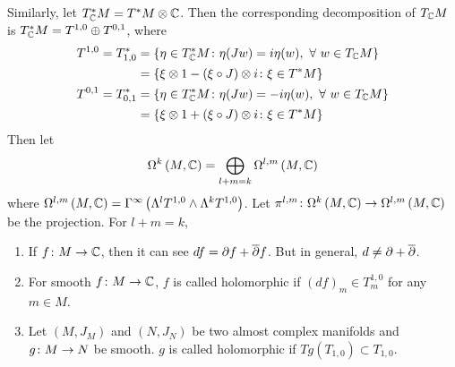 \documentclass[a4paper,12pt]{article}
\begin{document}
	Similarly, let $T^*_{\mathbb{C}}M = T^*M \otimes \mathbb{C}$. Then the corresponding decomposition of $T_{\mathbb{C}}M$ is $T^*_{\mathbb{C}}M = T^{1,0} \oplus T^{0,1}$, where
	\begin{equation*}
		\begin{split}
			T^{1,0} = T_{1,0}^* &= \left\{\eta \in T^*_{\mathbb{C}}M \colon \eta(Jw) = i\eta(w),~\forall~w \in T_{\mathbb{C}}M\right\} \\
			&= \left\{\xi \otimes 1 - (\xi \circ J) \otimes i \colon \xi \in T^*M\right\}\\
			T^{0,1} = T_{0,1}^* &= \left\{\eta \in T^*_{\mathbb{C}}M \colon \eta(Jw) = -i\eta(w),~\forall~w \in T_{\mathbb{C}}M\right\} \\
			&= \left\{\xi \otimes 1 + (\xi \circ J) \otimes i \colon \xi \in T^*M\right\}
		\end{split}
	\end{equation*}
	Then let
	\begin{equation*}
		\Omega^k\left(M,\mathbb{C}\right) = \bigoplus_{l+m = k} \Omega^{l,m}\left(M,\mathbb{C}\right)
	\end{equation*}
	where $\Omega^{l,m}\left(M,\mathbb{C}\right) = \Gamma^{\infty}\left(\Lambda^lT^{1,0} \wedge \Lambda^kT^{1,0}\right)$. Let $\pi^{l,m} \colon \Omega^k\left(M,\mathbb{C}\right) \rightarrow \Omega^{l,m}\left(M,\mathbb{C}\right)$ be the projection. For $l+m = k$,
	\begin{center}
	\end{center}
	\begin{rem}
		\begin{enumerate}
			\item If $f \colon M \rightarrow \mathbb{C}$, then it can see $df = \partial f + \overline{\partial} f$. But in general, $d \neq \partial + \overline{\partial}$.
			\item For smooth $f \colon M \rightarrow \mathbb{C}$, $f$ is called holomorphic if $(df)_m \in T^{1,0}_m$ for any $m \in M$.
			\item Let $(M,J_M)$ and $(N,J_N)$ be two almost complex manifolds and $g \colon M \rightarrow N$ be smooth. $g$ is called holomorphic if $Tg(T_{1,0}) \subset T_{1,0}$.
		\end{enumerate}
	\end{rem}
\end{document}
